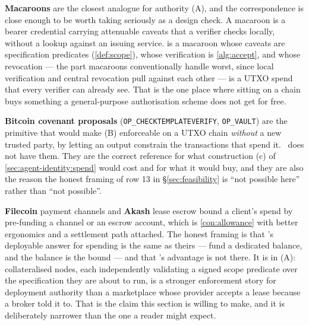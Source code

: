 \textbf{Macaroons} \citep{birgisson2014macaroons} are the closest analogue for authority (A), and the
correspondence is close enough to be worth taking seriously as a design check. A macaroon is a bearer
credential carrying attenuable caveats that a verifier checks locally, without a lookup against an
issuing service.  is a macaroon whose caveats are specification predicates
(\cref{def:scope}), whose verification is \cref{alg:accept}, and whose revocation --- the part
macaroons conventionally handle worst, since local verification and central revocation pull against
each other --- is a UTXO spend that every verifier can already see. That is the one place where
sitting on a chain buys something a general-purpose authorisation scheme does not get for free.

\textbf{Bitcoin covenant proposals} (\texttt{OP\_CHECKTEMPLATEVERIFY}, \texttt{OP\_VAULT}) are the
primitive that would make (B) enforceable on a UTXO chain \emph{without} a new trusted party, by
letting an output constrain the transactions that spend it. \Flux\ does not have them. They are the
correct reference for what construction (c) of \cref{sec:agent-identity:spend} would cost and for what
it would buy, and they are also the reason the honest framing of row 13 in \S\ref{sec:feasibility} is ``not possible
here'' rather than ``not possible''.

\textbf{Filecoin} \citep{filecoin2017} payment channels and \textbf{Akash} \citep{akash} lease escrow
bound a client's spend by pre-funding a channel or an escrow account, which is
\cref{con:allowance} with better ergonomics and a settlement path attached. The honest framing is
that \Flux's deployable answer for spending is the same as theirs --- fund a dedicated balance, and
the balance is the bound --- and that \Flux's advantage is not there. It is in (A): collateralised
nodes, each independently validating a signed scope predicate over the specification they are about
to run, is a stronger enforcement story for deployment authority than a marketplace whose provider
accepts a lease because a broker told it to. That is the claim this section is willing to make, and
it is deliberately narrower than the one a reader might expect.

\FloatBarrier
